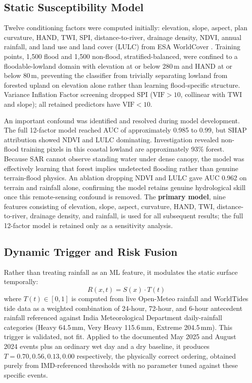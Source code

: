 \documentclass[conference]{IEEEtran}
\begin{document}
\subsection{Static Susceptibility Model}
Twelve conditioning factors were computed initially: elevation, slope, aspect, plan curvature, HAND, TWI, SPI, distance-to-river, drainage density, NDVI, annual rainfall, and land use and land cover (LULC) from ESA WorldCover \cite{zanaga2021}. Training points, 1{,}500 flood and 1{,}500 non-flood, stratified-balanced, were confined to a floodable-lowland domain with elevation at or below 280\,m and HAND at or below 80\,m, preventing the classifier from trivially separating lowland from forested upland on elevation alone rather than learning flood-specific structure. Variance Inflation Factor screening dropped SPI ($\mathrm{VIF}>10$, collinear with TWI and slope); all retained predictors have $\mathrm{VIF}<10$.

An important confound was identified and resolved during model development. The full 12-factor model reached AUC of approximately 0.985 to 0.99, but SHAP attribution showed NDVI and LULC dominating. Investigation revealed non-flood training pixels in this coastal lowland are approximately 93\% forest. Because SAR cannot observe standing water under dense canopy, the model was effectively learning that forest implies undetected flooding rather than genuine terrain-flood physics. An ablation dropping NDVI and LULC gave AUC 0.962 on terrain and rainfall alone, confirming the model retains genuine hydrological skill once this remote-sensing confound is removed. The \textbf{primary model}, nine features consisting of elevation, slope, aspect, curvature, HAND, TWI, distance-to-river, drainage density, and rainfall, is used for all subsequent results; the full 12-factor model is retained only as a sensitivity analysis.

\subsection{Dynamic Trigger and Risk Fusion}
Rather than treating rainfall as an ML feature, it modulates the static surface temporally:
\begin{equation}
R(x,t) = S(x)\cdot T(t)
\label{eq:fusion}
\end{equation}
where $T(t) \in [0,1]$ is computed from live Open-Meteo rainfall and WorldTides tide data as a weighted combination of 24-hour, 72-hour, and 6-hour antecedent rainfall referenced against India Meteorological Department daily-rainfall categories (Heavy 64.5\,mm, Very Heavy 115.6\,mm, Extreme 204.5\,mm). This trigger is validated, not fit. Applied to the documented May 2025 and August 2024 events plus an ordinary wet day and a dry baseline, it produces $T = 0.70, 0.56, 0.13, 0.00$ respectively, the physically correct ordering, obtained purely from IMD-referenced thresholds with no parameter tuned against these specific events.
\end{document}
